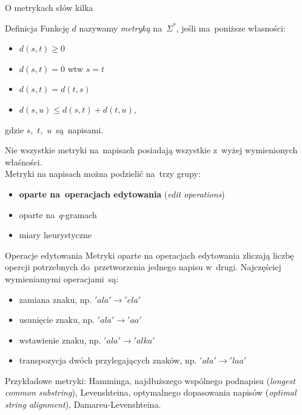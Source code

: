 \documentclass[11pt,pdftex,mathserif]{beamer}\usepackage[]{graphicx}\usepackage[]{color}
\theoremstyle{definition}
\begin{document}
\begin{frame}{O metrykach słów kilka}
\begin{block}{Definicja}
Funkcję $d$ nazywamy \emph{metryką} na~$\Sigma^*$, jeśli ma~poniższe własności:
\begin{itemize}
\item $d(s,t) \geq 0$
\item $d(s,t) = 0$ wtw $s = t$
\item $d(s,t) = d(t,s)$
\item $d(s,u) \leq d(s,t) + d(t,u)$,
\end{itemize}
gdzie $s$,~$t$,~$u$~są~napisami.
\end{block}
Nie wszystkie metryki na~napisach posiadają wszystkie z~wyżej wymienionych właśności.\\
Metryki na napisach można podzielić na~trzy grupy:
\begin{itemize}
\item \textbf{oparte na~operacjach edytowania} (\emph{edit operations})
\item oparte na~$q$-gramach
\item miary heurystyczne
\end{itemize}
\end{frame}



\begin{frame}{Operacje edytowania}
Metryki oparte na operacjach edytowania zliczają liczbę opercji potrzebnych do~przetworzenia jednego napisu w~drugi. Najczęściej wymieniamymi operacjami~są:
\begin{itemize}
\item zamiana znaku, np. $'ala' \rightarrow 'ela'$
\item usunięcie znaku, np. $'ala' \rightarrow 'aa'$
\item wstawienie znaku, np. $'ala' \rightarrow 'alka'$
\item transpozycja dwóch przylegających znaków, np. $'ala' \rightarrow 'laa'$
\end{itemize}
\pause
Przykładowe metryki: Hamminga, najdłuższego wspólnego podnapisu (\emph{longest common substring}), Levenshteina, optymalnego dopasowania napisów (\emph{optimal string alignment}), Damareu-Levenshteina.

\end{frame}
\end{document}
